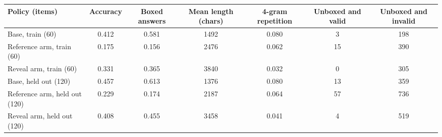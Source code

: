 \begin{tabular}{lcccccc}
\toprule
Policy (items) & Accuracy & Boxed answers & Mean length (chars) & 4-gram repetition & Unboxed and valid & Unboxed and invalid \\
\midrule
Base, train (60) & 0.412 & 0.581 & 1492 & 0.080 & 3 & 198 \\
Reference arm, train (60) & 0.175 & 0.156 & 2476 & 0.062 & 15 & 390 \\
Reveal arm, train (60) & 0.331 & 0.365 & 3840 & 0.032 & 0 & 305 \\
Base, held out (120) & 0.457 & 0.613 & 1376 & 0.080 & 13 & 359 \\
Reference arm, held out (120) & 0.229 & 0.174 & 2187 & 0.064 & 57 & 736 \\
Reveal arm, held out (120) & 0.408 & 0.455 & 3458 & 0.041 & 4 & 519 \\
\bottomrule
\end{tabular}
